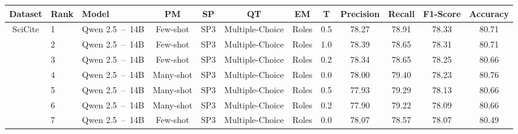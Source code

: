 \begin{table*}[t]
    \centering
    \scriptsize
    \begin{tabular}{cllccccccccc}
        \hline
        \textbf{Dataset}            & \textbf{Rank}     & \textbf{Model}        & \textbf{PM}   & \textbf{SP}     & \textbf{QT}             & \textbf{EM}   & \textbf{T}    & \textbf{Precision}    & \textbf{Recall}   & \textbf{F1-Score}     & \textbf{Accuracy}     \\
        \hline
        \multirow{20}{*}{SciCite}   & 1                 & Qwen 2.5~--~14B       & Few-shot      & SP3             & Multiple-Choice         & Roles         & 0.5           & 78.27                 & 78.91             & 78.33                 & 80.71                 \\
                                    & 2                 & Qwen 2.5~--~14B       & Few-shot      & SP3             & Multiple-Choice         & Roles         & 1.0           & 78.39                 & 78.65             & 78.31                 & 80.71                 \\
                                    & 3                 & Qwen 2.5~--~14B       & Few-shot      & SP3             & Multiple-Choice         & Roles         & 0.2           & 78.34                 & 78.65             & 78.25                 & 80.66                 \\
                                    & 4                 & Qwen 2.5~--~14B       & Many-shot     & SP3             & Multiple-Choice         & Roles         & 0.0           & 78.00                 & 79.40             & 78.23                 & 80.76                 \\
                                    & 5                 & Qwen 2.5~--~14B       & Many-shot     & SP3             & Multiple-Choice         & Roles         & 0.5           & 77.93                 & 79.29             & 78.13                 & 80.66                 \\
                                    & 6	                & Qwen 2.5~--~14B       & Many-shot     & SP3             & Multiple-Choice         & Roles         & 0.2           & 77.90                 & 79.22             & 78.09                 & 80.66                 \\
                                    & 7                 & Qwen 2.5~--~14B       & Few-shot      & SP3             & Multiple-Choice         & Roles         & 0.0           & 78.07                 & 78.57             & 78.07                 & 80.49                 \\

\end{tabular}
\end{table*}
